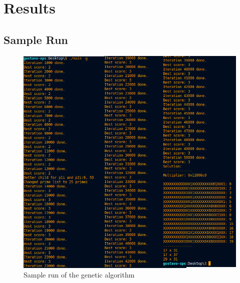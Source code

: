 \documentclass[12pt]{article}
\begin{document}
\section{Results}
\subsection{Sample Run}
\begin{figure}[h]
    \centerline{\includegraphics[scale=.5]{GASampleRun}}
\caption{Sample run of the genetic algorithm}
\end{figure}
\end{document}
